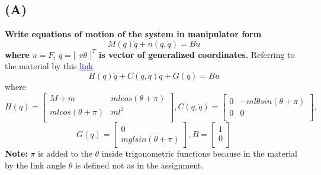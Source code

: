 \documentclass[a4paper,11pt]{article}
\theoremstyle{mytheor}
\begin{document}
\subsection*{(A)} 
\textbf{Write equations of motion of the system in manipulator form} \newline
\[
M(q)\ddot{q}+n(q,\dot{q})=Bu
\]
\textbf{where} $u = F$, $q = [$ $x$\space\space$\theta$ $]^{T}$ \textbf{is vector of generalized coordinates.}\newline
Referring to the material by this           
\href{https://ocw.mit.edu/courses/electrical-engineering-and-computer-science/6-832-underactuated-robotics-spring-2009/readings/MIT6_832s09_read_ch03.pdf}{\textcolor{blue}{\underline{link}}}\newline
\[
    H(q)\ddot{q}+C(q, \dot{q})\dot{q}+G(q)=Bu
\]
where
\[
H(q)=
\begin{bmatrix}
M+m&mlcos(\theta+\pi)\\
mlcos(\theta+\pi)&ml^{2}\\
\end{bmatrix}
,
C(q, \dot{q})=
\begin{bmatrix}
0&-ml\dot{\theta} sin(\theta+\pi)\\
0&0\\
\end{bmatrix},
\]
\[
G(q)=
\begin{bmatrix}
0\\
mglsin(\theta+\pi)
\end{bmatrix}
,
B=
\begin{bmatrix}
1\\
0\\
\end{bmatrix}
\]
\textbf{Note:} $\pi$ is added to the $\theta$ inside trigonometric functions because in the material by the link angle $\theta$ is defined not as in the assignment.\newline 
\end{document}
